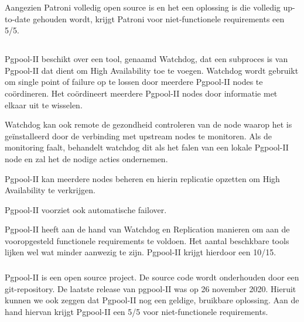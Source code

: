 Aangezien Patroni volledig open source is en het een oplossing is die volledig up-to-date gehouden wordt, krijgt Patroni voor niet-functionele requirements een 5/5.



\subsection{}
\label{subsec: Oplossing 2: Pgpool-II}

\subsubsection{}
\label{subsubsec:Functionele Requirements}

Pgpool-II beschikt over een tool, genaamd Watchdog, dat een subproces is van Pgpool-II dat dient om High Availability toe te voegen. Watchdog wordt gebruikt om single point of failure op te lossen door meerdere Pgpool-II nodes te coördineren. Het coördineert meerdere Pgpool-II nodes door informatie met elkaar uit te wisselen.

Watchdog kan ook remote de gezondheid controleren van de node waarop het is geïnstalleerd door de verbinding met upstream nodes te monitoren. Als de monitoring faalt, behandelt watchdog dit als het falen van een lokale Pgpool-II node en zal het de nodige acties ondernemen.

Pgpool-II kan meerdere nodes beheren en hierin replicatie opzetten om High Availability te verkrijgen.

Pgpool-II voorziet ook automatische failover.

Pgpool-II heeft aan de hand van Watchdog en Replication manieren om aan de vooropgesteld functionele requirements te voldoen. Het aantal beschkbare tools lijken wel wat minder aanwezig te zijn. Pgpool-II krijgt hierdoor een 10/15.

\subsubsection{}
\label{subsubsec:Niet-functionele Requirements}

Pgpool-II is een open source project. De source code wordt onderhouden door een git-repository.
De laatste release van pgpool-II was op 26 november 2020. Hieruit kunnen we ook zeggen dat Pgpool-II nog een geldige, bruikbare oplossing.
Aan de hand hiervan krijgt Pgpool-II een 5/5 voor niet-functionele requirements.

